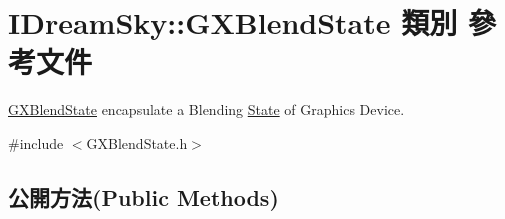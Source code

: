 \hypertarget{class_i_dream_sky_1_1_g_x_blend_state}{}\section{I\+Dream\+Sky\+:\+:G\+X\+Blend\+State 類別 參考文件}
\label{class_i_dream_sky_1_1_g_x_blend_state}


\hyperlink{class_i_dream_sky_1_1_g_x_blend_state}{G\+X\+Blend\+State} encapsulate a Blending \hyperlink{class_i_dream_sky_1_1_state}{State} of Graphics Device.  




{\ttfamily \#include $<$G\+X\+Blend\+State.\+h$>$}

\subsection*{公開方法(Public Methods)}
